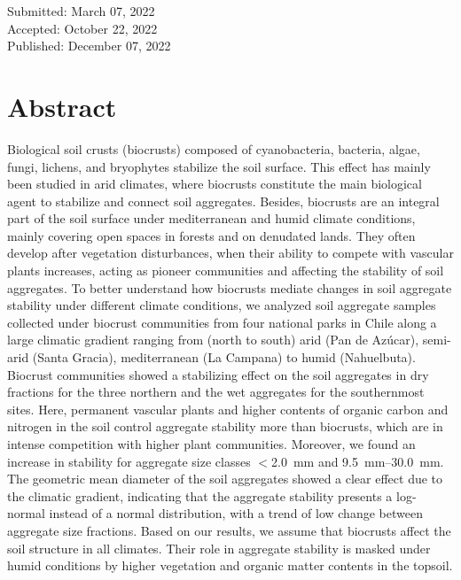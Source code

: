 \vspace{0.5cm}

\begin{center}
    Submitted: March 07, 2022\\
    Accepted: October 22, 2022\\
    Published: December 07, 2022
\end{center}

\cleardoublepage

\section*{Abstract} %
Biological soil crusts (biocrusts) composed of cyanobacteria, bacteria, algae, fungi, lichens, and bryophytes stabilize the soil surface. This effect has mainly been studied in arid climates, where biocrusts constitute the main biological agent to stabilize and connect soil aggregates. Besides, biocrusts are an integral part of the soil surface under mediterranean and humid climate conditions, mainly covering open spaces in forests and on denudated lands. They often develop after vegetation disturbances, when their ability to compete with vascular plants increases, acting as pioneer communities and affecting the stability of soil aggregates. To better understand how biocrusts mediate changes in soil aggregate stability under different climate conditions, we analyzed soil aggregate samples collected under biocrust communities from four national parks in Chile along a large climatic gradient ranging from (north to south) arid (Pan de Azúcar), semi-arid (Santa Gracia), mediterranean (La Campana) to humid (Nahuelbuta). Biocrust communities showed a stabilizing effect on the soil aggregates in dry fractions for the three northern and the wet aggregates for the southernmost sites. Here, permanent vascular plants and higher contents of organic carbon and nitrogen in the soil control aggregate stability more than biocrusts, which are in intense competition with higher plant communities. Moreover, we found an increase in stability for aggregate size classes $<$\SI{2.0}{\milli\meter} and \SIrange[range-phrase=--,range-units=single]{9.5}{30.0}{\milli\meter}. The geometric mean diameter of the soil aggregates showed a clear effect due to the climatic gradient, indicating that the aggregate stability presents a log-normal instead of a normal distribution, with a trend of low change between aggregate size fractions. Based on our results, we assume that biocrusts affect the soil structure in all climates. Their role in aggregate stability is masked under humid conditions by higher vegetation and organic matter contents in the topsoil.

